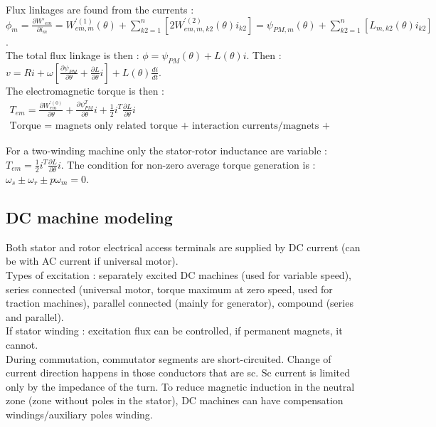 \documentclass[../main.tex]{subfiles}
\begin{document}
Flux linkages are found from the currents : $\phi_m = \frac{\partial W'_{em}}{\partial i_m} = W_{em,m}^{'(1)}(\theta) + \sum_{k2=1}^n[2W_{em,m,k2}^{'(2)}(\theta) i_{k2}] = \psi_{PM,m} (\theta)  + \sum_{k2=1}^n[L_{m,k2}(\theta) i_{k2}]$.\\
The total flux linkage is then : $\phi = \psi_{PM}(\theta) + L(\theta) i$. Then : $v = Ri + \omega[\frac{\partial \psi_{PM}}{\partial \theta} + \frac{\partial L}{\partial \theta} i]+ L(\theta) \frac{di}{dt}$.\\
The electromagnetic torque is then : \begin{equation}
    \begin{gathered}
        T_{em} = \frac{\partial W_{em}^{'(0)}}{\partial \theta} + \frac{\partial \psi_{PM}^T}{\partial\theta} i + \frac{1}{2}i^T \frac{\partial L}{\partial \theta}i\\
        \text{Torque = magnets only related torque + interaction currents/magnets + interaction currents/magnets.}
    \end{gathered}
\end{equation}

\warning For a two-winding machine only the stator-rotor inductance are variable : $T_{em} = \frac{1}{2}i^T \frac{\partial L}{\partial \theta}i$. The condition for non-zero average torque generation is : $\omega_s \pm \omega_r \pm p\omega_m = 0$.\\

\subsection{DC machine modeling}
Both stator and rotor electrical access terminals are supplied by DC current (can be with AC current if universal motor).\\
Types of excitation : separately excited DC machines (used for variable speed), series connected (universal motor, torque maximum at zero speed, used for traction machines), parallel connected (mainly for generator), compound (series and parallel). \\
If stator winding : excitation flux can be controlled, if permanent magnets, it cannot.\\

During commutation, commutator segments are short-circuited. Change of current direction happens in those conductors that are sc. Sc current is limited only by the impedance of the turn. To reduce magnetic induction in the neutral zone (zone without poles in the stator), DC machines can have compensation windings/auxiliary poles winding.\\
\end{document}
